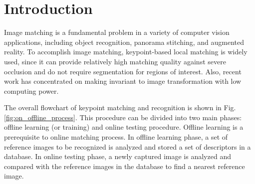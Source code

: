 
\section{Introduction}
\label{sec:intro}

Image matching is a fundamental problem in a variety of computer vision applications, including object recognition\cite{nister_scalable_2006}, panorama stitching\cite{brown_recognising_2003}, and augmented reality\cite{wagner_multiple_2009}. To accomplish image matching, keypoint-based local matching is widely used, since it can provide relatively high matching quality against severe occlusion and do not require segmentation for regions of interest. Also, recent work has concentrated on making invariant to image transformation with low computing power\cite{carrera_robust_2007,mikolajczyk_performance_2005}.


The overall flowchart of keypoint matching and recognition is shown in Fig. \ref{fig:on_offline_process}. This procedure can be divided into two main phases: offline learning (or training) and online testing procedure. Offline learning is a prerequisite to online matching process. In offline learning phase, a set of reference images to be recognized is analyzed and stored a set of descriptors in a database. In online testing phase, a newly captured image is analyzed and compared with the reference images in the database to find a nearest reference image. 

